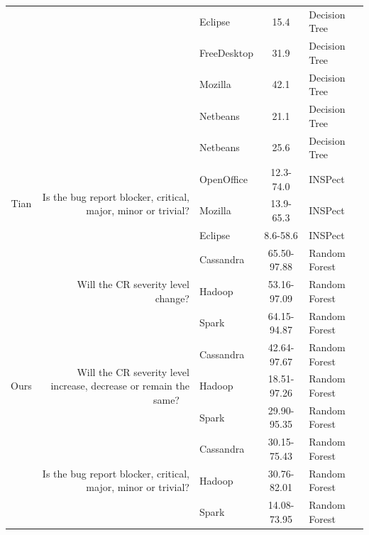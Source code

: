 \begin{table}[!h]
\begin{tabular}{|c|p{2.1cm}|p{1.3cm}|c|p{1.8cm}|}
\cline{3-5}          &       & Eclipse & 15.4  & Decision Tree \\
\cline{3-5}          &       & FreeDesktop & 31.9  & Decision Tree \\
\cline{3-5}          &       & Mozilla & 42.1  & Decision Tree \\
\cline{3-5}          &       & Netbeans & 21.1  & Decision Tree \\
\cline{3-5}          &       & Netbeans & 25.6  & Decision Tree \\
    \hline
    \multirow{3}[6]{*}{\begin{turn}{88}\scriptsize{Tian\cite{Tian2012}}\end{turn}} & \multicolumn{1}{r|}{\multirow{3}[6]{2.1cm}{Is the bug report blocker, critical, major, minor or trivial?}} & OpenOffice & 12.3-74.0 & INSPect \\
\cline{3-5}          &       & Mozilla & 13.9-65.3 & INSPect \\
\cline{3-5}          &       & Eclipse & 8.6-58.6 & INSPect \\
    \hline
    \multirow{9}[18]{*}{\begin{turn}{88}\scriptsize{Ours}\end{turn}} & \multicolumn{1}{r|}{\multirow{3}[6]{2.1cm}{Will the CR severity level change?}} & Cassandra & 65.50-97.88 & Random Forest \\
\cline{3-5}          &       & Hadoop & 53.16-97.09 & Random Forest \\
\cline{3-5}          &       & Spark & 64.15-94.87 & Random Forest \\
\cline{2-5}          & \multicolumn{1}{r|}{\multirow{3}[6]{2.1cm}{Will the CR severity level increase, decrease or remain the same?\linebreak$\quad$}} & Cassandra & 42.64-97.67 & Random Forest \\
\cline{3-5}          &       & Hadoop & 18.51-97.26 & Random Forest \\
\cline{3-5}          &       & Spark & 29.90-95.35 & Random Forest \\
\cline{2-5}          & \multicolumn{1}{r|}{\multirow{3}[6]{2.1cm}{Is the bug report blocker, critical, major, minor or trivial?}} & Cassandra & 30.15-75.43 & Random Forest \\
\cline{3-5}          &       & Hadoop & 30.76-82.01 & Random Forest \\
\cline{3-5}          &       & Spark & 14.08-73.95 & Random Forest \\
    \hline
    \end{tabular}%
  \label{tab:performance_summary_literature}%
\end{table}%




